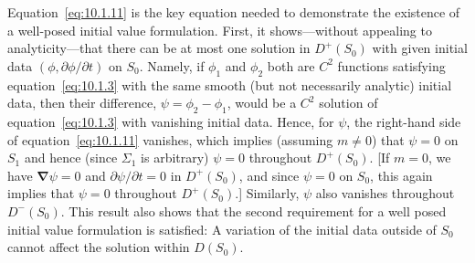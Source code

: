 Equation~\eqref{eq:10.1.11} is the key equation needed to demonstrate the
existence of a well-posed initial value formulation. First, it shows---without appealing
to analyticity---that there can be at most one solution in \(D^+(S_0)\) with given
initial data \((\phi,\partial\phi/\partial t)\) on \(S_0\). Namely, if \(\phi_1\) and
\(\phi_2\) both are \(C^2\) functions satisfying equation~\eqref{eq:10.1.3} with the
same smooth (but not necessarily analytic) initial data, then their difference,
\(\psi=\phi_2-\phi_1\), would be a \(C^2\) solution of
equation~\eqref{eq:10.1.3} with vanishing initial data. Hence, for \(\psi\), the
right-hand side of equation~\eqref{eq:10.1.11} vanishes, which implies (assuming
\(m\ne0\)) that \(\psi=0\) on \(S_1\) and hence (since \(\Sigma_1\) is arbitrary)
\(\psi=0\) throughout \(D^+(S_0)\). [If \(m=0\), we have
\(\boldsymbol{\nabla}\psi=0\) and \(\partial\psi/\partial t=0\) in \(D^+(S_0)\), and since
\(\psi=0\) on \(S_0\), this again implies that \(\psi=0\) throughout
\(D^+(S_0)\).] Similarly, \(\psi\) also vanishes throughout \(D^-(S_0)\). This
result also shows that the second requirement for a well posed initial value formulation
is satisfied: A variation of the initial data outside of \(S_0\) cannot affect the solution
within \(D(S_0)\).

